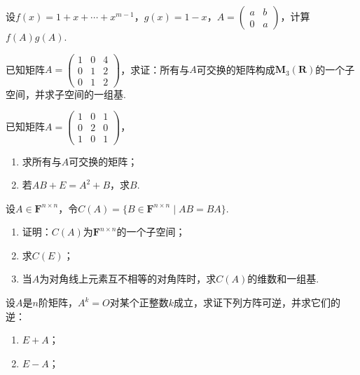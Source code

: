 \begin{exercise}
    \begin{exgroup}
        \item 设$f(x)=1+x+\cdots+x^{m-1}$，$g(x)=1-x$，$A=\begin{pmatrix}
                a & b \\ 0 & a
            \end{pmatrix}$，计算$f(A)g(A)$.

        \item 已知矩阵$A=\begin{pmatrix}
                1 & 0 & 4 \\ 0 & 1 & 2 \\ 0 & 1 & 2
            \end{pmatrix}$，求证：所有与$A$可交换的矩阵构成$\mathbf{M}_3(\mathbf{R})$的一个子空间，并求子空间的一组基.

        \item 已知矩阵$A=\begin{pmatrix}
                1 & 0 & 1 \\ 0 & 2 & 0 \\ 1 & 0 & 1
            \end{pmatrix}$，
        \begin{enumerate}
            \item 求所有与$A$可交换的矩阵；

            \item 若$AB+E=A^2+B$，求$B$.
        \end{enumerate}

        \item 设$A \in \mathbf{F}^{n \times n}$，令$C(A)=\{B \in \mathbf{F}^{n \times n} \mid AB=BA\}$.
        \begin{enumerate}
            \item 证明：$C(A)$为$\mathbf{F}^{n \times n}$的一个子空间；

            \item 求$C(E)$；

            \item 当$A$为对角线上元素互不相等的对角阵时，求$C(A)$的维数和一组基.
        \end{enumerate}

        \item 设$A$是$n$阶矩阵，$A^k=O$对某个正整数$k$成立，求证下列方阵可逆，并求它们的逆：
        \begin{enumerate}
            \item $E+A$；

            \item $E-A$；


\end{enumerate}
\end{exgroup}
\end{exercise}
